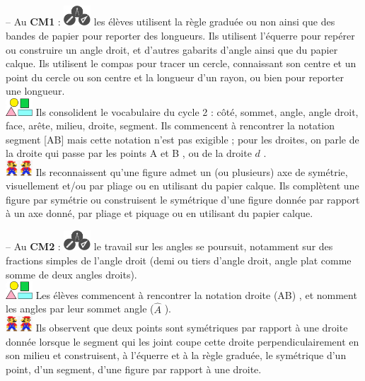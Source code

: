 -- Au {\bf CM1} : \includegraphics[width=10mm]{Geometrie_did/Images/Geo5_cours_outils} les élèves utilisent la règle graduée ou non ainsi que des bandes de papier pour reporter des longueurs. Ils utilisent l’équerre pour repérer ou construire un angle droit, et d’autres gabarits d’angle ainsi que du papier calque. Ils utilisent le compas pour tracer un cercle, connaissant son centre et un point du cercle ou son centre et la longueur d’un rayon, ou bien pour reporter une longueur.  \\
   \hspace*{17mm} \includegraphics[width=10mm]{Geometrie_did/Images/Geo5_cours_formes} Ils consolident le vocabulaire du cycle 2 : côté, sommet, angle, angle droit, face, arête, milieu, droite, segment. Ils commencent à rencontrer la notation \og segment [AB] \fg{} mais cette notation n’est pas exigible ; pour les droites, on parle de la droite \og qui passe par les points A et B \fg, ou de \og la droite $d$ \fg. \\
   \hspace*{17mm} \includegraphics[width=10mm]{Geometrie_did/Images/Geo5_cours_symetrie} Ils reconnaissent qu’une figure admet un (ou plusieurs) axe de symétrie, visuellement et/ou par pliage ou en utilisant du papier calque. Ils complètent une figure par symétrie ou construisent le symétrique d’une figure donnée par rapport à un axe donné, par pliage et piquage ou en utilisant du papier calque.

-- Au {\bf CM2} : \includegraphics[width=10mm]{Geometrie_did/Images/Geo5_cours_outils} le travail sur les angles se poursuit, notamment sur des fractions simples de l’angle droit (demi ou tiers d'angle droit, angle plat comme somme de deux angles droits). \\
\hspace*{17mm} \includegraphics[width=10mm]{Geometrie_did/Images/Geo5_cours_formes} Les élèves commencent à rencontrer la notation \og droite (AB) \fg, et nomment les angles par leur sommet \og angle ($\widehat{A}$ \fg). \\
\hspace*{17mm} \includegraphics[width=10mm]{Geometrie_did/Images/Geo5_cours_symetrie} Ils observent que deux points sont symétriques par rapport à une droite donnée lorsque le segment qui les joint coupe cette droite perpendiculairement en son milieu et construisent, à l’équerre et à la règle graduée, le symétrique d’un point, d’un segment, d’une figure par rapport à une droite.


